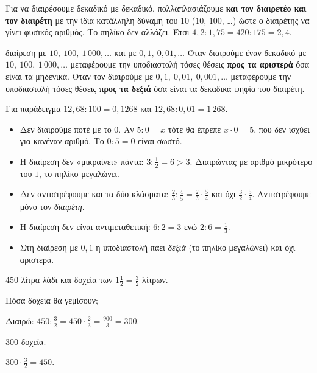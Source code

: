 Για να διαιρέσουμε δεκαδικό με δεκαδικό, πολλαπλασιάζουμε \textbf{και τον διαιρετέο και τον διαιρέτη} με την ίδια κατάλληλη δύναμη του $10$ ($10$, $100$, \dots) ώστε ο διαιρέτης να γίνει φυσικός αριθμός. Το πηλίκο δεν αλλάζει. Έτσι $4{,}2:1{,}75=420:175=2{,}4$.

\begin{kanonas}{διαίρεση με $10,\ 100,\ 1\,000,\dots$ και με $0{,}1,\ 0{,}01,\dots$}
Όταν διαιρούμε έναν δεκαδικό με $10,\ 100,\ 1\,000,\dots$ μεταφέρουμε την υποδιαστολή τόσες θέσεις \textbf{προς τα αριστερά} όσα είναι τα μηδενικά. Όταν τον διαιρούμε με $0{,}1,\ 0{,}01,\ 0{,}001,\dots$ μεταφέρουμε την υποδιαστολή τόσες θέσεις \textbf{προς τα δεξιά} όσα είναι τα δεκαδικά ψηφία του διαιρέτη.
\end{kanonas}

Για παράδειγμα $12{,}68:100=0{,}1268$ και $12{,}68:0{,}01=1\,268$.

\begin{prosoxi}
\begin{itemize}[leftmargin=1.2em,itemsep=0.3ex,topsep=2pt]
\item Δεν διαιρούμε ποτέ με το $0$. Αν $5:0=x$ τότε θα έπρεπε $x\cdot0=5$, που δεν ισχύει για κανέναν αριθμό. Το $0:5=0$ είναι σωστό.
\item Η διαίρεση δεν «μικραίνει» πάντα: $3:\frac{1}{2}=6>3$. Διαιρώντας με αριθμό μικρότερο του $1$, το πηλίκο μεγαλώνει.
\item Δεν αντιστρέφουμε και τα δύο κλάσματα: $\frac{2}{3}:\frac{4}{5}=\frac{2}{3}\cdot\frac{5}{4}$ και όχι $\frac{3}{2}\cdot\frac{5}{4}$. Αντιστρέφουμε μόνο τον \emph{διαιρέτη}.
\item Η διαίρεση δεν είναι αντιμεταθετική: $6:2=3$ ενώ $2:6=\frac{1}{3}$.
\item Στη διαίρεση με $0{,}1$ η υποδιαστολή πάει \emph{δεξιά} (το πηλίκο μεγαλώνει) και όχι αριστερά.
\end{itemize}
\end{prosoxi}


\tixero $450$ λίτρα λάδι και δοχεία των $1\frac{1}{2}=\frac{3}{2}$ λίτρων.\par
\tithelo Πόσα δοχεία θα γεμίσουν;\par
\possindeo Διαιρώ: $450:\frac{3}{2}=450\cdot\frac{2}{3}=\frac{900}{3}=300$.\par
\apantisi $300$ δοχεία.\par
\elegxos $300\cdot\frac{3}{2}=450$.

